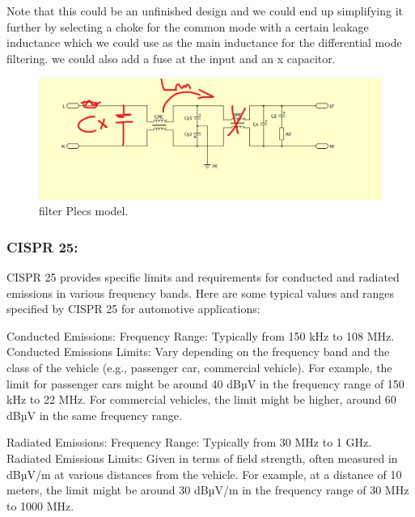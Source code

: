 \documentclass{article}
\begin{document}

Note that this could be an unfinished design and we could end up simplifying it further by selecting a choke for the common mode with a certain leakage inductance which we could use as the main inductance for the differential mode filtering.
we could also add a fuse at the input and an x capacitor.

\begin{figure}[htbp]
    \centering
    \includegraphics[width=\textwidth]{Filter plecs model simplification.png}
    \caption{filter Plecs model.}
    \label{fig:Filter plecs model simplification.}
\end{figure}
\subsubsection{CISPR 25:}
CISPR 25 provides specific limits and requirements for conducted and radiated emissions in various frequency bands. Here are some typical values and ranges specified by CISPR 25 for automotive applications:

Conducted Emissions:
Frequency Range: Typically from 150 kHz to 108 MHz.
Conducted Emissions Limits: Vary depending on the frequency band and the class of the vehicle (e.g., passenger car, commercial vehicle).
For example, the limit for passenger cars might be around 40 dBµV in the frequency range of 150 kHz to 22 MHz.
For commercial vehicles, the limit might be higher, around 60 dBµV in the same frequency range.

Radiated Emissions:
Frequency Range: Typically from 30 MHz to 1 GHz.
Radiated Emissions Limits: Given in terms of field strength, often measured in dBµV/m at various distances from the vehicle.
For example, at a distance of 10 meters, the limit might be around 30 dBµV/m in the frequency range of 30 MHz to 1000 MHz.

\end{document}
